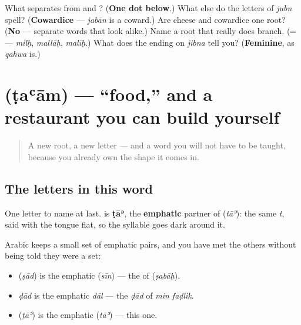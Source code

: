 \begin{tcolorbox}[breakable,colback=teal!4,colframe=teal!35!black,title={Before you move on}]
What separates \textbf{} from \textbf{} and \textbf{}? (\textbf{One dot below}.) What else do the letters of \emph{jubn} spell? (\textbf{Cowardice} — \emph{jabān} is a coward.) Are cheese and cowardice one root? (\textbf{No} — separate words that look alike.) Name a root that really does branch. (\textbf{--} — \emph{milḥ}, \emph{mallāḥ}, \emph{malīḥ}.) What does the ending on \emph{jibna} tell you? (\textbf{Feminine}, as \emph{qahwa} is.)
\end{tcolorbox}
\section[\texorpdfstring{\ar{طعام} (ṭaʿām)}{طعام (ṭaʿām)}]{ (ṭaʿām) — \textquotedblleft{}food,\textquotedblright{} and a restaurant you can build yourself}

\label{lesson:AR-C34-taam}



\begin{quote}
A new root, a new letter — and a word you will not have to be taught, because you already own the shape it comes in.
\end{quote}

\subsection*{The letters in this word}
One letter to name at last. \textbf{} is \textbf{ṭāʾ}, the \textbf{emphatic} partner of \textbf{} (\emph{tāʾ}): the same \emph{t}, said with the tongue flat, so the syllable goes dark around it.

Arabic keeps a small set of emphatic pairs, and you have met the others without being told they were a set:

\begin{itemize}
\raggedright
  \item \textbf{} (\emph{ṣād}) is the emphatic \textbf{} (\emph{sīn}) — the  of \textbf{} (\emph{ṣabāḥ}).
  \item \emph{ḍād} is the emphatic \emph{dāl} — the \emph{ḍād} of \emph{min faḍlik}.
  \item \textbf{} (\emph{ṭāʾ}) is the emphatic \textbf{} (\emph{tāʾ}) — this one.
\end{itemize}

